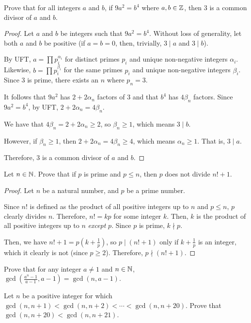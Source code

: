 \question Prove that for all integers $a$ and $b$,
if $9a^2 = b^4$ where $a,b\in\mathbb{Z}$, then 3 is a common divisor of $a$ and $b$.
\begin{proof}
  Let $a$ and $b$ be integers such that $9a^2=b^4$.
  Without loss of generality, let both $a$ and $b$ be positive
  (if $a=b=0$, then, trivially, $3 \mid a$ and $3 \mid b$).

  By UFT, $a=\prod p_i^{\alpha_i}$ for distinct primes $p_i$ and unique non-negative integers $\alpha_i$.
  Likewise, $b=\prod p_i^{\beta_i}$ for the same primes $p_i$ and unique non-negative integers $\beta_i$.
  Since 3 is prime, there exists an $n$ where $p_n=3$.

  It follows that $9a^2$ has $2+2\alpha_n$ factors of 3 and that $b^4$ has $4\beta_n$ factors.
  Since $9a^2=b^4$, by UFT, $2+2\alpha_n=4\beta_n$.

  We have that $4\beta_n = 2+2\alpha_n \geq 2$, so $\beta_n \geq 1$, which means $3 \mid b$.

  However, if $\beta_n \geq 1$, then $2+2\alpha_n = 4\beta_n \geq 4$, which means $\alpha_n \geq 1$.
  That is, $3 \mid a$.

  Therefore, 3 is a common divisor of $a$ and $b$.
\end{proof}


\question Let $n\in\mathbb{N}$. Prove that if $p$ is prime and $p \leq n$, then $p$ does not divide $n! + 1$.
\begin{proof}
  Let $n$ be a natural number, and $p$ be a prime number.

  Since $n!$ is defined as the product of all positive integers up to $n$ and $p \leq n$, $p$ clearly divides $n$.
  Therefore, $n! = kp$ for some integer $k$.
  Then, $k$ is the product of all positive integers up to $n$ \emph{except} $p$.
  Since $p$ is prime, $k \nmid p$.

  Then, we have $n!+1 = p(k+\frac{1}{p})$, so $p \mid (n!+1)$ only if $k+\frac{1}{p}$ is an integer,
  which it clearly is not (since $p \geq 2$).
  Therefore, $p \nmid (n!+1)$.
\end{proof}



\question Prove that for any integer $a \neq 1$ and $n\in\mathbb{N}$,
$\gcd\left( \frac{a^n-1}{a-1}, a-1 \right) = \gcd(n, a-1)$.

\question Let $n$ be a positive integer for which
$\gcd(n, n + 1) < \gcd(n, n + 2) < \cdots < {\gcd(n, n + 20)}$.
Prove that $\gcd(n, n + 20) < \gcd(n, n + 21)$.

